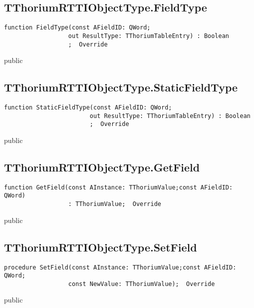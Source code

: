 \subsection{TThoriumRTTIObjectType.FieldType}
\label{thoriumcore:thorium:tthoriumrttiobjecttype:fieldtype}
\begin{FPCList}
\Synopsis
\Declaration 

\begin{verbatim}
function FieldType(const AFieldID: QWord;
                  out ResultType: TThoriumTableEntry) : Boolean
                  ;  Override
\end{verbatim}
\Visibility
public
\Description
\Errors
\end{FPCList}
\subsection{TThoriumRTTIObjectType.StaticFieldType}
\label{thoriumcore:thorium:tthoriumrttiobjecttype:staticfieldtype}
\begin{FPCList}
\Synopsis
\Declaration 

\begin{verbatim}
function StaticFieldType(const AFieldID: QWord;
                        out ResultType: TThoriumTableEntry) : Boolean
                        ;  Override
\end{verbatim}
\Visibility
public
\Description
\Errors
\end{FPCList}
\subsection{TThoriumRTTIObjectType.GetField}
\label{thoriumcore:thorium:tthoriumrttiobjecttype:getfield}
\begin{FPCList}
\Synopsis
\Declaration 

\begin{verbatim}
function GetField(const AInstance: TThoriumValue;const AFieldID: QWord)
                  : TThoriumValue;  Override
\end{verbatim}
\Visibility
public
\Description
\Errors
\end{FPCList}
\subsection{TThoriumRTTIObjectType.SetField}
\label{thoriumcore:thorium:tthoriumrttiobjecttype:setfield}
\begin{FPCList}
\Synopsis
\Declaration 

\begin{verbatim}
procedure SetField(const AInstance: TThoriumValue;const AFieldID: QWord;
                  const NewValue: TThoriumValue);  Override
\end{verbatim}
\Visibility
public
\Description
\Errors
\end{FPCList}
